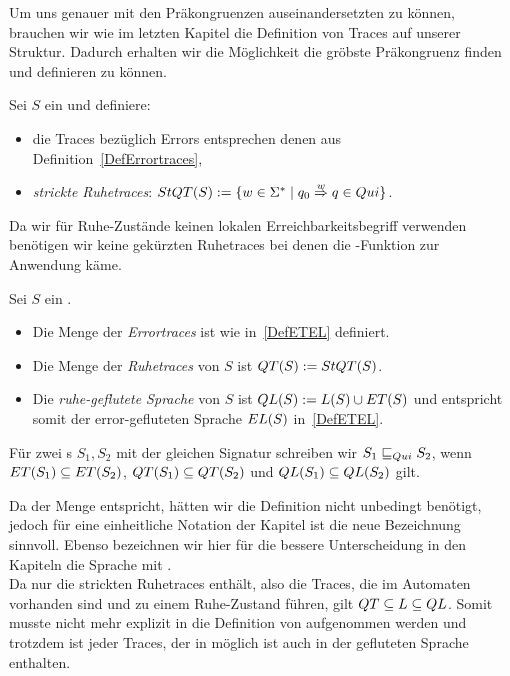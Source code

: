 Um uns genauer mit den Präkongruenzen auseinandersetzten zu können, brauchen
wir wie im letzten Kapitel die Definition von Traces auf unserer Struktur.
Dadurch erhalten wir die Möglichkeit die gröbste Präkongruenz finden und
definieren zu können.

\begin{Def}
  \label{DefRuhetraces}
  Sei $S$ ein \EIO{} und definiere:
  \begin{itemize}
    \item die Traces bezüglich Errors entsprechen denen
      aus Definition~\ref{DefErrortraces},
    \item \emph{strickte Ruhetraces}: $StQT{}(S) := \{w\in\Sigma ^*\mid q_0
      \overset{w}{\Rightarrow} q\in Qui\}$.
  \end{itemize}
\end{Def}

Da wir für Ruhe-Zustände keinen lokalen Erreichbarkeitsbegriff verwenden benötigen
wir keine gekürzten Ruhetraces bei denen die \prune{}-Funktion zur
Anwendung käme.

\begin{Def}
  \label{DefQTQL}
  Sei $S$ ein \EIO{}.
  \begin{itemize}
    \item Die Menge der \emph{Errortraces} ist wie in~\ref{DefETEL} definiert.
    \item Die Menge der \emph{Ruhetraces} von $S$ ist $QT{}(S) := StQT{}(S)$.
    \item Die \emph{ruhe-geflutete Sprache} von $S$ ist
      $QL{}(S):=L(S)\cup ET{}(S)$ und entspricht somit der error-gefluteten
      Sprache $EL{}(S)$ in~\ref{DefETEL}.
  \end{itemize}
  Für zwei \EIO{}s $S_1, S_2$ mit der gleichen Signatur schreiben wir
  $S_1\sqsubseteq _{Qui} S_2$, wenn $ET{}(S_1)\subseteq ET{}(S_2)$,
  $QT{}(S_1)\subseteq QT{}(S_2)$ und $QL{}(S_1)\subseteq QL{}(S_2)$ gilt.
\end{Def}

Da \QT{} der Menge \StQT{} entspricht, hätten wir die Definition nicht
unbedingt benötigt, jedoch für eine einheitliche Notation der Kapitel ist die
neue Bezeichnung sinnvoll. Ebenso bezeichnen wir hier für die bessere
Unterscheidung in den Kapiteln die Sprache \EL{} mit \QL{}.\\
Da \QT{} nur die strickten Ruhetraces enthält, also die Traces, die im
Automaten vorhanden sind und zu einem Ruhe-Zustand führen, gilt
$QT{}\subseteq L\subseteq QL{}$. Somit musste \QT{} nicht mehr explizit in die
Definition von \QL{} aufgenommen werden und trotzdem ist jeder Traces, der in
\QT{} möglich ist auch in der gefluteten Sprache enthalten.


